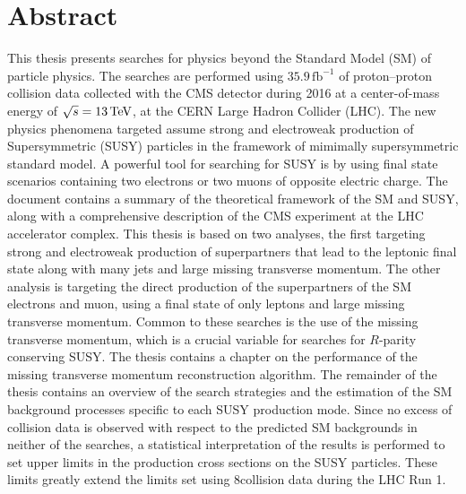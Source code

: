 \chapter*{Abstract}
\noindent\justify
This thesis presents searches for physics beyond the Standard Model (SM) of particle physics. 
The searches are performed using $35.9\,\mathrm{fb^{-1}}$ of proton--proton collision data collected with the CMS detector during 2016 at a center-of-mass energy of $\sqrt{s}=13\,\text{Te\hspace{-.08em}V}$, at the CERN Large Hadron Collider (LHC). 
The new physics phenomena targeted assume strong and electroweak production of Supersymmetric (SUSY) particles in the framework of mimimally supersymmetric standard model. 
A powerful tool for searching for SUSY is by using final state scenarios containing two electrons or two muons of opposite electric charge.  
\newpara
\noindent\justify
The document contains a summary of the theoretical framework of the SM and SUSY, along with a comprehensive description of the CMS experiment at the LHC accelerator complex. 
This thesis is based on two analyses, the first targeting strong and electroweak production of superpartners that lead to the leptonic final state along with many jets and large missing transverse momentum. 
The other analysis is targeting the direct production of the superpartners of the SM electrons and muon, using a final state of only leptons and large missing transverse momentum. 
Common to these searches is the use of the missing transverse momentum, which is a crucial variable for searches for $R$-parity conserving SUSY. 
\newpara
\noindent\justify
The thesis contains a chapter on the performance of the missing transverse momentum reconstruction algorithm.  
The remainder of the thesis contains an overview of the search strategies and the estimation of the SM background processes specific to each SUSY production mode. 
\newpara
\noindent\justify
Since no excess of collision data is observed with respect to the predicted SM backgrounds in neither of the searches, a statistical interpretation of the results is performed to set upper limits in the production cross sections on the SUSY particles. 
These limits greatly extend the limits set using 8\TeV collision data during the LHC Run 1. 
